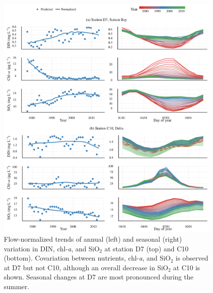 \documentclass[letterpaper,12pt,oneside]{article}\usepackage[]{graphicx}\usepackage[]{color}
\makeatletter
\def\maxwidth{ %
  \ifdim\Gin@nat@width>\linewidth
    \linewidth
  \else
    \Gin@nat@width
  \fi
}
\makeatother
\begin{document}
\begin{figure}[!ht]

{\centering \includegraphics[width=\maxwidth]{figs/d7c10trnds-1} 

}

\caption{Flow-normalized trends of annual (left) and seasonal (right) variation in DIN, chl-{\it\footnotesize a}, and SiO$_2$ at station D7 (top) and C10 (bottom).  Covariation between nutrients, chl-{\it\footnotesize a}, and SiO$_2$ is observed at D7 but not C10, although an overall decrease in SiO$_2$ at C10 is shown.  Seasonal changes at D7 are most pronounced during the summer.}\label{fig:d7c10trnds}
\end{figure}



\clearpage
\end{document}
